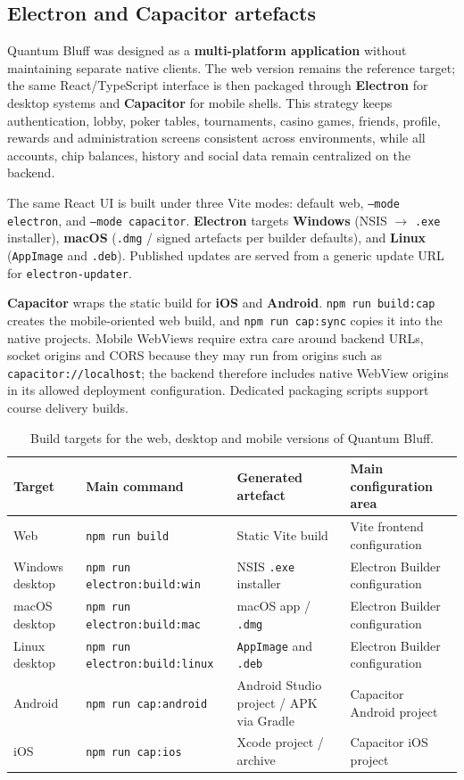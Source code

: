 \documentclass[11pt,a4paper]{article}
\begin{document}
\subsection{Electron and Capacitor artefacts}

Quantum Bluff was designed as a \textbf{multi-platform application} without maintaining separate native clients. The web version remains the reference target; the same React/TypeScript interface is then packaged through \textbf{Electron} for desktop systems and \textbf{Capacitor} for mobile shells. This strategy keeps authentication, lobby, poker tables, tournaments, casino games, friends, profile, rewards and administration screens consistent across environments, while all accounts, chip balances, history and social data remain centralized on the backend.

The same React UI is built under three Vite modes: default web, \texttt{--mode electron}, and \texttt{--mode capacitor}. \textbf{Electron} targets \textbf{Windows} (NSIS $\rightarrow$ \texttt{.exe} installer), \textbf{macOS} (\texttt{.dmg} / signed artefacts per builder defaults), and \textbf{Linux} (\texttt{AppImage} and \texttt{.deb}). Published updates are served from a generic update URL for \texttt{electron-updater}.

\textbf{Capacitor} wraps the static build for \textbf{iOS} and \textbf{Android}. \texttt{npm run build:cap} creates the mobile-oriented web build, and \texttt{npm run cap:sync} copies it into the native projects. Mobile WebViews require extra care around backend URLs, socket origins and CORS because they may run from origins such as \texttt{capacitor://localhost}; the backend therefore includes native WebView origins in its allowed deployment configuration. Dedicated packaging scripts support course delivery builds.

\begin{table}[htbp]
\centering
\scriptsize
\setlength{\tabcolsep}{3pt}
\begin{tabular}{@{}p{2.5cm}p{3.4cm}p{3.2cm}p{4.2cm}@{}}
\toprule
Target & Main command & Generated artefact & Main configuration area \\
\midrule
Web & \texttt{npm run build} & Static Vite build & Vite frontend configuration \\
Windows desktop & \texttt{npm run electron:build:win} & NSIS \texttt{.exe} installer & Electron Builder configuration \\
macOS desktop & \texttt{npm run electron:build:mac} & macOS app / \texttt{.dmg} & Electron Builder configuration \\
Linux desktop & \texttt{npm run electron:build:linux} & \texttt{AppImage} and \texttt{.deb} & Electron Builder configuration \\
Android & \texttt{npm run cap:android} & Android Studio project / APK via Gradle & Capacitor Android project \\
iOS & \texttt{npm run cap:ios} & Xcode project / archive & Capacitor iOS project \\
\bottomrule
\end{tabular}
\caption{Build targets for the web, desktop and mobile versions of Quantum Bluff.}\label{tab:platform-builds}
\end{table}
\end{document}
